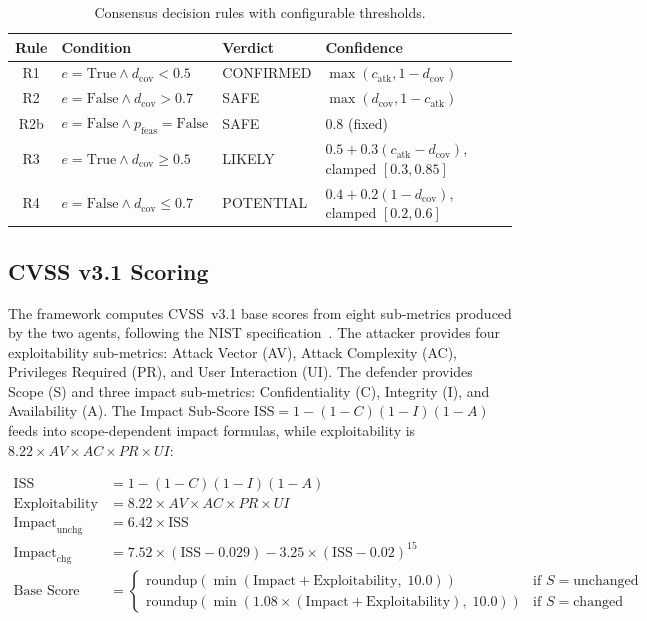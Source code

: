 \begin{table}[H]
\centering
\small
\caption{Consensus decision rules with configurable thresholds.}
\label{tab:consensus-rules}
\begin{tabular}{clll}
\toprule
\textbf{Rule} & \textbf{Condition} & \textbf{Verdict} & \textbf{Confidence} \\
\midrule
R1  & $e = \text{True} \wedge d_{\text{cov}} < 0.5$ & CONFIRMED & $\max(c_{\text{atk}}, 1 - d_{\text{cov}})$ \\
R2  & $e = \text{False} \wedge d_{\text{cov}} > 0.7$ & SAFE & $\max(d_{\text{cov}}, 1 - c_{\text{atk}})$ \\
R2b & $e = \text{False} \wedge p_{\text{feas}} = \text{False}$ & SAFE & $0.8$ (fixed) \\
R3  & $e = \text{True} \wedge d_{\text{cov}} \geq 0.5$ & LIKELY & $0.5 + 0.3(c_{\text{atk}} - d_{\text{cov}})$, clamped $[0.3, 0.85]$ \\
R4  & $e = \text{False} \wedge d_{\text{cov}} \leq 0.7$ & POTENTIAL & $0.4 + 0.2(1 - d_{\text{cov}})$, clamped $[0.2, 0.6]$ \\
\bottomrule
\end{tabular}
\end{table}

\subsection{CVSS v3.1 Scoring}

The framework computes CVSS~v3.1 base scores from eight sub-metrics produced by the two agents, following the NIST specification~\cite{cvss31}. The attacker provides four exploitability sub-metrics: Attack Vector (AV), Attack Complexity (AC), Privileges Required (PR), and User Interaction (UI). The defender provides Scope (S) and three impact sub-metrics: Confidentiality (C), Integrity (I), and Availability (A). The Impact Sub-Score $\text{ISS} = 1 - (1-C)(1-I)(1-A)$ feeds into scope-dependent impact formulas, while exploitability is $8.22 \times AV \times AC \times PR \times UI$:

\begin{align}
\text{ISS} &= 1 - (1 - C)(1 - I)(1 - A) \label{eq:iss} \\
\text{Exploitability} &= 8.22 \times AV \times AC \times PR \times UI \label{eq:exploitability} \\
\text{Impact}_{\text{unchg}} &= 6.42 \times \text{ISS} \\
\text{Impact}_{\text{chg}} &= 7.52 \times (\text{ISS} - 0.029) - 3.25 \times (\text{ISS} - 0.02)^{15} \\
\text{Base Score} &= \begin{cases}
    \text{roundup}(\min(\text{Impact} + \text{Exploitability},\; 10.0)) & \text{if } S = \text{unchanged} \\
    \text{roundup}(\min(1.08 \times (\text{Impact} + \text{Exploitability}),\; 10.0)) & \text{if } S = \text{changed}
\end{cases} \label{eq:cvss-base}
\end{align}

